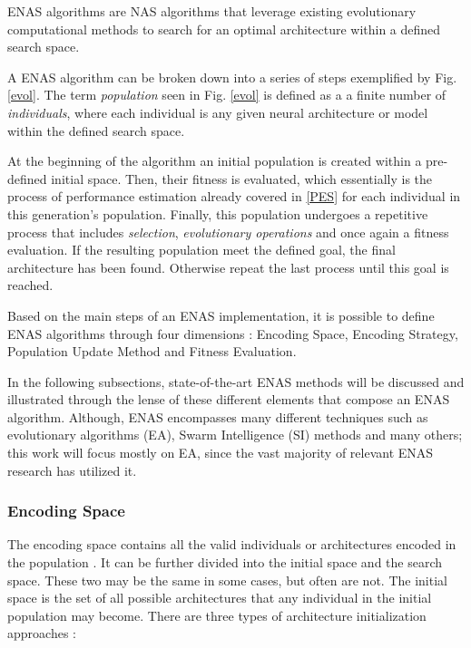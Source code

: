 \documentclass[10pt,        %
               a4paper,     %
               journal,     %
               ]{IEEEtran}
\begin{document}
ENAS algorithms are NAS algorithms that leverage existing evolutionary computational methods
to search for an optimal architecture within a defined search space.

A ENAS algorithm can be broken down into a series of steps exemplified by Fig. \ref{evol}. The term \textit{population} seen
in Fig. \ref{evol} is defined as a
a finite number of \textit{individuals}, where each individual is any given neural architecture or model within the defined  search space.

At the beginning of the algorithm an initial population is created within a pre-defined initial space.
Then, their fitness is evaluated, which essentially is the process of performance estimation already covered in \ref{PES}
for each individual in this generation's population. Finally, this population undergoes a repetitive process that
includes \textit{selection}, \textit{evolutionary operations} and once again a fitness evaluation. If the resulting
population meet the defined goal, the final architecture has been found. Otherwise repeat the last process until this
goal is reached.

Based on the main steps of an ENAS implementation, it is possible to define ENAS algorithms
through four dimensions \cite{liu2021survey}: Encoding Space, Encoding Strategy, Population Update Method and
Fitness Evaluation.

In the following subsections, state-of-the-art ENAS methods will be discussed and illustrated through
the lense of these different elements that compose an ENAS algorithm. Although, ENAS encompasses many different
techniques such as evolutionary algorithms (EA), Swarm Intelligence (SI) methods and many others;
this work will focus mostly on EA, since the vast majority of relevant ENAS research has utilized it.

\subsubsection{Encoding Space}
The encoding space contains all the valid individuals or architectures encoded in the population \cite{liu2021survey}.
It can be further divided into the initial space and the search space. These two may be the same in some cases,
but often are not. The initial space is the set of all possible architectures that any individual in the initial population may
become. There are three types of architecture initialization approaches \cite{liu2021survey}:
\end{document}
